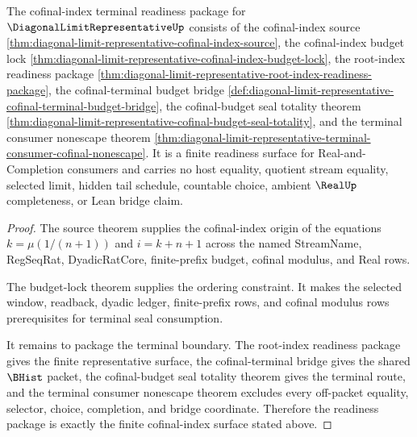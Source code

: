 \begin{theorem}
\label{thm:diagonal-limit-representative-cofinal-index-terminal-readiness}
The cofinal-index terminal readiness package for $\DiagonalLimitRepresentativeUp$ consists of the cofinal-index source \autoref{thm:diagonal-limit-representative-cofinal-index-source}, the cofinal-index budget lock \autoref{thm:diagonal-limit-representative-cofinal-index-budget-lock}, the root-index readiness package \autoref{thm:diagonal-limit-representative-root-index-readiness-package}, the cofinal-terminal budget bridge \autoref{def:diagonal-limit-representative-cofinal-terminal-budget-bridge}, the cofinal-budget seal totality theorem \autoref{thm:diagonal-limit-representative-cofinal-budget-seal-totality}, and the terminal consumer nonescape theorem \autoref{thm:diagonal-limit-representative-terminal-consumer-cofinal-nonescape}. It is a finite readiness surface for Real-and-Completion consumers and carries no host equality, quotient stream equality, selected limit, hidden tail schedule, countable choice, ambient $\RealUp$ completeness, or Lean bridge claim.
\end{theorem}
\begin{proof}
The source theorem supplies the cofinal-index origin of the equations $k=\mu(1/(n+1))$ and $i=k+n+1$ across the named StreamName, RegSeqRat, DyadicRatCore, finite-prefix budget, cofinal modulus, and Real rows.

The budget-lock theorem supplies the ordering constraint. It makes the selected window, readback, dyadic ledger, finite-prefix rows, and cofinal modulus rows prerequisites for terminal seal consumption.

It remains to package the terminal boundary. The root-index readiness package gives the finite representative surface, the cofinal-terminal bridge gives the shared $\BHist$ packet, the cofinal-budget seal totality theorem gives the terminal route, and the terminal consumer nonescape theorem excludes every off-packet equality, selector, choice, completion, and bridge coordinate. Therefore the readiness package is exactly the finite cofinal-index surface stated above.
\end{proof}
